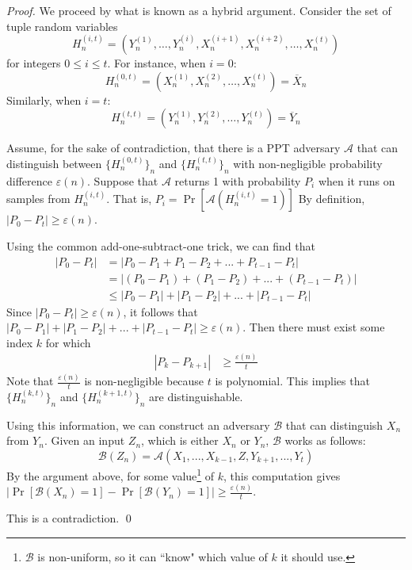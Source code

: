 \documentclass[12pt]{tufte-book}
\newcommand{\ma}{\mathcal{A}}
\newcommand{\mb}{\mathcal{B}}
\begin{document}
\begin{proof}
We proceed by what is known as a hybrid argument.
Consider the set of tuple random variables
$$H^{(i,t)}_n = (Y_n^{(1)},\hdots,Y_n^{(i)},X_n^{(i+1)},X_n^{(i+2)},\hdots,X_n^{(t)})$$
for integers $0\le i\le t$. 
For instance, when $i=0$:
$$H^{(0,t)}_n = (X_n^{(1)},X_n^{(2)},\hdots,X_n^{(t)}) = \overline{X}_n$$
Similarly, when $i=t$:
$$H^{(t,t)}_n = (Y_n^{(1)},Y_n^{(2)},\hdots,Y_n^{(t)}) = \overline{Y}_n$$

Assume, for the sake of contradiction, that there is a PPT adversary $\ma$ that can distinguish between $\{H^{(0,t)}_n\}_n$ and $\{H^{(t,t)}_n\}_n$ with non-negligible probability difference $\varepsilon(n)$. Suppose that $\ma$ returns 1 with probability $P_i$ when it runs on samples from $H^{(i,t)}_n$. 
That is, $P_i = \Pr[\ma(H^{(i,t)}_n = 1)]$
By definition, $|P_0 - P_t|\ge \varepsilon(n)$. 

Using the common add-one-subtract-one trick, we can find that
\begin{align*}
|P_0 - P_t| &= |P_0 - P_{1} + P_{1} - P_{2} + ... + P_{t-1} - P_{t}| \\
&= |(P_0 - P_{1}) + (P_{1} - P_{2}) + ... + (P_{t-1} - P_{t})| \\
&\leq  |P_0 - P_{1}| + |P_{1} - P_{2}| + ... + |P_{t-1} - P_{t}|
\end{align*}
Since $|P_0 - P_t| \ge \varepsilon(n)$, it follows that $|P_0 - P_{1}| + |P_{1} - P_{2}| + ... + |P_{t-1} - P_{t}| \ge \varepsilon(n)$.
Then there must exist some index $k$ for which
\begin{align*}
|P_k - P_{k+1}| &\geq \frac{\varepsilon(n)}{t}
\end{align*}
Note that $\frac{\varepsilon(n)}{t}$ is non-negligible because $t$ is polynomial.
This implies that $\{H^{(k,t)}_n\}_n$ and $\{H^{(k+1,t)}_n\}_n$ are distinguishable.

Using this information, we can construct an adversary $\mb$ that can distinguish $X_n$ from $Y_n$.
Given an input $Z_n$, which is either $X_n$ or $Y_n$, $\mb$ works as follows:
$$\mb(Z_n) = \ma(X_1, ..., X_{k-1}, Z, Y_{k+1}, ..., Y_t)$$
By the argument above, for some value\footnote{$\mb$ is non-uniform, so it can ``know" which value of $k$ it should use.} of $k$, this computation gives $|\Pr[\mb(X_n)=1] - \Pr[\mb(Y_n) = 1]| \ge \frac{\varepsilon(n)}{t}$.


This is a contradiction. 
\qed


\end{proof}
\end{document}
